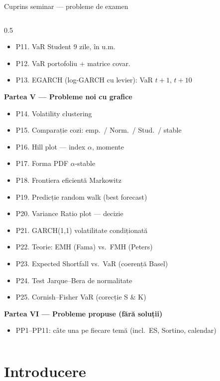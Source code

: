 \documentclass[9pt, aspectratio=169, t]{beamer}
\begin{document}
\begin{frame}[shrink=25]{Cuprins seminar --- probleme de examen}
\begin{columns}[T]
\begin{column}{0.5\textwidth}
\begin{itemize}
    \item P11. VaR Student 9 zile, în u.m.
    \item P12. VaR portofoliu + matrice covar.
    \item P13. EGARCH (log-GARCH cu levier): VaR $t+1$, $t+10$
\end{itemize}
\textbf{Partea V --- Probleme noi cu grafice}
\begin{itemize}\setlength{\itemsep}{0pt}
    \item P14. Volatility clustering
    \item P15. Comparație cozi: emp.\ / Norm.\ / Stud.\ / stable
    \item P16. Hill plot --- index $\alpha$, momente
    \item P17. Forma PDF $\alpha$-stable
    \item P18. Frontiera eficientă Markowitz
    \item P19. Predicție random walk (best forecast)
    \item P20. Variance Ratio plot --- decizie
    \item P21. GARCH(1,1) volatilitate condiționată
    \item P22. Teorie: EMH (Fama) vs.\ FMH (Peters)
    \item P23. Expected Shortfall vs.\ VaR (coerență Basel)
    \item P24. Test Jarque--Bera de normalitate
    \item P25. Cornish--Fisher VaR (corecție S \& K)
\end{itemize}
\textbf{Partea VI --- Probleme propuse (fără soluții)}
\begin{itemize}\setlength{\itemsep}{0pt}
    \item PP1--PP11: câte una pe fiecare temă (incl.\ ES, Sortino, calendar)
\end{itemize}
\end{column}
\end{columns}
\end{frame}

\section{Introducere}
\end{document}
